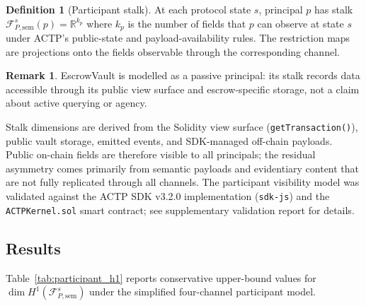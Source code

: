 \documentclass[11pt]{article}
\theoremstyle{plain}
\theoremstyle{definition}
\newtheorem{definition}[theorem]{Definition}
\newtheorem{remark}[theorem]{Remark}
\newcommand{\Fsh}{\mathcal{F}}         %
\newcommand{\Hone}{H^{1}}
\newcommand{\RR}{\mathbb{R}}
\newcommand{\dimn}{\operatorname{dim}}
\begin{document}
\begin{definition}[Participant stalk]\label{def:participant_stalk}
At each protocol state $s$, principal $p$ has stalk $\Fsh_{P,\mathrm{sem}}^s(p) = \RR^{k_p}$
where $k_p$ is the number of fields that $p$ can observe at state $s$ under
ACTP's public-state and payload-availability rules.  The restriction maps are
projections onto the fields observable through the corresponding channel.
\end{definition}

\begin{remark}
EscrowVault is modelled as a passive principal: its stalk records data
accessible through its public view surface and escrow-specific storage, not a
claim about active querying or agency.
\end{remark}

Stalk dimensions are derived from the Solidity view surface
(\texttt{getTransaction()}), public vault storage, emitted events, and
SDK-managed off-chain payloads.  Public on-chain fields are therefore visible
to all principals; the residual asymmetry comes primarily from semantic
payloads and evidentiary content that are not fully replicated through all
channels.  The participant visibility model was validated against the ACTP SDK
v3.2.0 implementation (\texttt{sdk-js}) and the \texttt{ACTPKernel.sol} smart
contract; see supplementary validation report for details.

\subsection{Results}
\label{sec:participant_results}

Table~\ref{tab:participant_h1} reports conservative upper-bound values for
$\dimn\Hone(\Fsh_{P,\mathrm{sem}}^s)$ under the simplified four-channel participant model.
\end{document}
